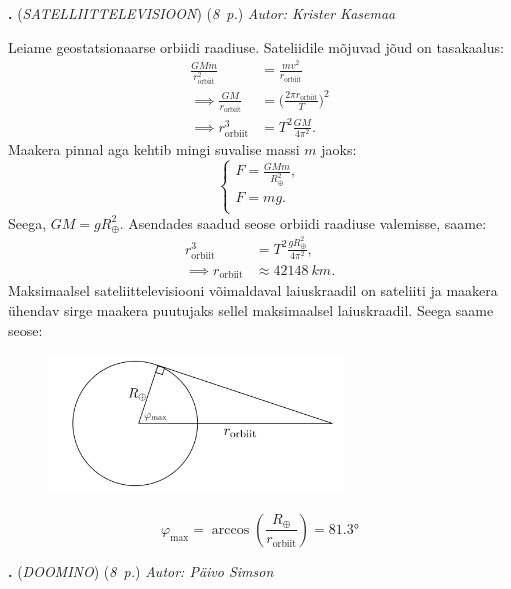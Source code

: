 \documentclass[11pt,a5paper]{article}
\newcommand{\numb}[1]{\vspace{5pt}\textbf{\large #1}}
\newcommand{\nimi}[1]{(\textsl{\small #1})}
\newcommand{\punktid}[1]{(\emph{#1~p.})}
\newcounter{ylesanne}
\newcommand{\yl}[1]{\addtocounter{ylesanne}{1}\numb{\theylesanne.} \nimi{#1} \newblock{}}
\newcommand{\autor}[1]{\emph{Autor: #1}}%
\begin{document}
\newpage
\yl{SATELLIITTELEVISIOON}
\punktid{8} \autor{Krister Kasemaa}

Leiame geostatsionaarse orbiidi raadiuse. Sateliidile mõjuvad jõud on tasakaalus:
\begin{align*}
\frac{GMm}{r_\text{orbiit}^2}&=\frac{mv^2}{r_\text{orbiit}}\\
\implies \frac{GM}{r_\text{orbiit}}&= \bigg( \frac{2\pi r_\text{orbiit}}{T} \bigg)^2\\
\implies r_\text{orbiit}^3 &= T^2 \frac{GM}{4 \pi^2}.
\end{align*}
Maakera pinnal aga kehtib mingi suvalise massi $m$ jaoks:
\begin{equation*}
  \begin{cases}
    F = \frac{GMm}{R_\oplus^2}, \\
    F = mg. \\
  \end{cases}
\end{equation*}
Seega, $GM = g R_\oplus^2$. Asendades saadud seose orbiidi raadiuse valemisse, saame:
\begin{align*}
r_\mathrm{orbiit}^3 &= T^2 \frac{g R_\oplus^2}{4 \pi^2},\\
\implies r_\mathrm{orbiit} &\approx \SI{42148}{km}.
\end{align*}
Maksimaalsel sateliittelevisiooni võimaldaval laiuskraadil on sateliiti ja maakera ühendav sirge maakera puutujaks sellel maksimaalsel laiuskraadil. Seega saame seose:
\begin{figure}[h]
  \centering
  \includegraphics[width = 0.7\textwidth]{satteliittelevisioon_diagramm.png}
\end{figure}
\begin{equation*}
\varphi_\mathrm{max} = \arccos{\left( \frac{R_\oplus}{r_\text{orbiit}}\right)} = \ang{81.3}
\end{equation*}

\yl{DOOMINO}
\punktid{8} \autor{Päivo Simson}
\end{document}
